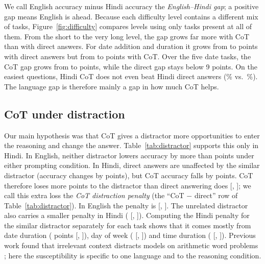 

We call English accuracy minus Hindi accuracy the \emph{English--Hindi gap}; a positive gap means English is ahead. Because each difficulty level contains a different mix of tasks, Figure~\ref{fig:difficulty} compares levels using only tasks present at all of them. From the short to the very long level, the gap grows far more with CoT than with direct answers. For date addition and duration it grows from \GapADirectShort{} to \GapADirectVeryLong{} points with direct answers but from \GapACotShort{} to \GapACotVeryLong{} points with CoT. Over the five date tasks, the CoT gap grows from \GapCotShort{} to \GapCotVeryLong{} points, while the direct gap stays below 9 points. On the easiest questions, Hindi CoT does not even beat Hindi direct answers (\AHiCotShort{}\% vs.\ \AHiDirectShort{}\%). The language gap is therefore mainly a gap in how much CoT helps.

\subsection{CoT under distraction}
\label{sec:distraction}



Our main hypothesis was that CoT gives a distractor more opportunities to enter the reasoning and change the answer. Table~\ref{tab:distractor} supports this only in Hindi. In English, neither distractor lowers accuracy by more than \EnMaxDrop{} points under either prompting condition. In Hindi, direct answers are unaffected by the similar distractor (accuracy changes by \HiDropDirectSim{} points), but CoT accuracy falls by \HiDropCotSimAbs{} points. CoT therefore loses \HiDidSimAbs{} more points to the distractor than direct answering does [\HiDidSimLo{}, \HiDidSimHi{}]; we call this extra loss the \emph{CoT distraction penalty} (the ``CoT $-$ direct'' row of Table~\ref{tab:distractor}). In English the penalty is \EnDidSim{} [\EnDidSimLo{}, \EnDidSimHi{}]. The unrelated distractor also carries a smaller penalty in Hindi (\HiDidDis{} [\HiDidDisLo{}, \HiDidDisHi{}]). Computing the Hindi penalty for the similar distractor separately for each task shows that it comes mostly from date duration (\HiDidSimDuration{} points [\HiDidSimDurationLo{}, \HiDidSimDurationHi{}]), day of week (\HiDidSimDow{} [\HiDidSimDowLo{}, \HiDidSimDowHi{}]) and time duration (\HiDidSimTimeDuration{} [\HiDidSimTimeDurationLo{}, \HiDidSimTimeDurationHi{}]). Previous work found that irrelevant context distracts models on arithmetic word problems \citep{shi-etal-2023-distracted}; here the susceptibility is specific to one language and to the reasoning condition.

